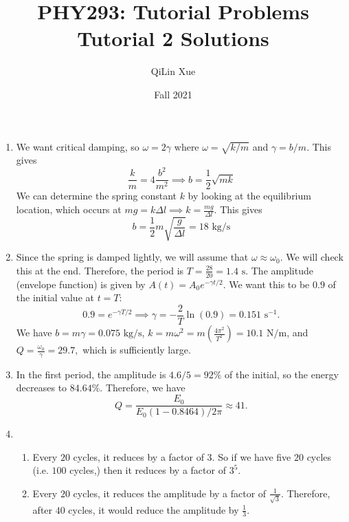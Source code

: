 \documentclass{article}
\title{PHY293: Tutorial Problems \\ \textbf{Tutorial 2 Solutions}}
\author{QiLin Xue}
\date{Fall 2021}
\begin{document}
\maketitle
\begin{enumerate}
    \item We want critical damping, so $\omega = 2\gamma$ where $\omega=\sqrt{k/m}$ and $\gamma=b/m$. This gives 
    \begin{equation}
        \frac{k}{m} = 4 \frac{b^2}{m^2} \implies b = \frac{1}{2}\sqrt{mk}
    \end{equation}
    We can determine the spring constant $k$ by looking at the equilibrium location, which occurs at $mg=k\Delta l \implies k = \frac{mg}{\Delta l}$. This gives 
    \begin{equation}
        b = \frac{1}{2}m\sqrt{\frac{g}{\Delta l}} = \boxed{\text{18 kg/s}}
    \end{equation}
    \item Since the spring is damped lightly, we will assume that $\omega \approx \omega_0$. We will check this at the end. Therefore, the period is $T = \frac{28}{20} = 1.4\text{ s}$. The amplitude (envelope function) is given by $A(t) = A_0 e^{-\gamma t/2}.$ We want this to be $0.9$ of the initial value at $t=T$: 
    \begin{equation}
        0.9 = e^{-\gamma T/2} \implies \gamma = -\frac{2}{T}\ln(0.9) = 0.151\text{ s}^{-1}.
    \end{equation} 
    We have $b=m\gamma = 0.075\text{ kg/s}$, $k = m\omega^2 = m\left(\frac{4\pi^2}{T^2}\right) = 10.1 \text{ N/m}$, and $Q=\frac{\omega_0}{\gamma} = 29.7,$ which is sufficiently large.
    \item In the first period, the amplitude is $4.6/5=92\%$ of the initial, so the energy decreases to $84.64\%.$ Therefore, we have 
    \begin{equation}
        Q = \frac{E_0}{E_0(1-0.8464)/2\pi} \approx 41.
    \end{equation}
    \item \begin{enumerate}
        \item Every $20$ cycles, it reduces by a factor of $3$. So if we have five $20$ cycles (i.e. $100$ cycles,) then it reduces by a factor of $3^5.$
        \item Every $20$ cycles, it reduces the amplitude by a factor of $\frac{1}{\sqrt{3}}$. Therefore, after $40$ cycles, it would reduce the amplitude by $\frac{1}{3}$.
    \end{enumerate}

\end{enumerate}
\end{document}
